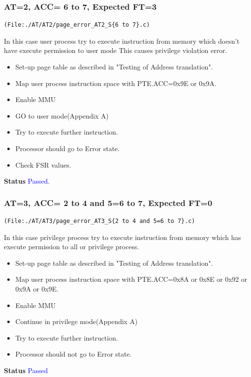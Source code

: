 \documentclass[12pt,a4paper]{article}
\begin{document}
\subsubsection{ AT=2, ACC= 6 to 7, Expected FT=3}
\begin{lstlisting}
(File:./AT/AT2/page_error_AT2_S{6 to 7}.c)
\end{lstlisting}
In this case user process try to execute instruction from memory which doesn't have  execute permission to user mode This causes privilege violation error.

\begin{itemize}
\item Set-up page table as described in "Testing of Address translation".
\item Map user process instruction space with PTE.ACC=0x9E or 0x9A.
\item Enable MMU
\item GO to user mode(Appendix A) 
\item Try to execute further instruction.
\item Processor should go to Error state. 
\item Check FSR values.
\end{itemize}
\textbf{Status} \textcolor{blue}{Passed}.
\subsubsection{ AT=3, ACC= 2 to 4 and 5=6 to 7, Expected FT=0}
\begin{lstlisting}
(File:./AT/AT3/page_error_AT3_S{2 to 4 and 5=6 to 7}.c)
\end{lstlisting}
In this case privilege process try to execute instruction from memory which has  execute permission to all or privilege process. 

\begin{itemize}
\item Set-up page table as described in "Testing of Address translation".
\item Map user process instruction space with PTE.ACC=0x8A or 0x8E or 0x92 or 0x9A or 0x9E. 
\item Enable MMU
\item Continue in privilege mode(Appendix A) 
\item Try to execute further instruction.
\item Processor should not go to Error state. 

\end{itemize}
\textbf{Status} \textcolor{blue}{Passed}
\end{document}
